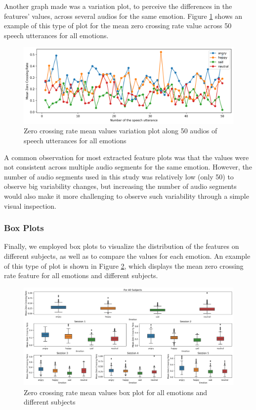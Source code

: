 Another graph made was a variation plot, to perceive the differences in the features' values, across several audios for the same emotion. Figure \ref{fig:zcrMeanVar} shows an example of this type of plot for the mean zero crossing rate value across 50 speech utterances for all emotions.

\begin{figure}[H]
	\centering
	\includegraphics[width=\linewidth]{figs/4_1_traditional/meanZCRVar.png}
	\caption{Zero crossing rate mean values variation plot along 50 audios of speech utterances for all emotions}
	\label{fig:zcrMeanVar}
\end{figure}

A common observation for most extracted feature plots was that the values were not consistent across multiple audio segments for the same emotion. However, the number of audio segments used in this study was relatively low (only 50) to observe big variability changes, but increasing the number of audio segments would also make it more challenging to observe such variability through a simple visual inspection.

\subsubsection{Box Plots}

Finally, we employed box plots to visualize the distribution of the features on different subjects, as well as to compare the values for each emotion. An example of this type of plot is shown in Figure \ref{fig:zcrMeanBoxPlot}, which displays the mean zero crossing rate feature for all emotions and different subjects. 

\begin{figure}[H]
	\centering
	\includegraphics[width=\linewidth]{figs/4_1_traditional/mean_zcr_box_plot.png}
	\caption{Zero crossing rate mean values box plot for all emotions and different subjects}
	\label{fig:zcrMeanBoxPlot}
\end{figure}

